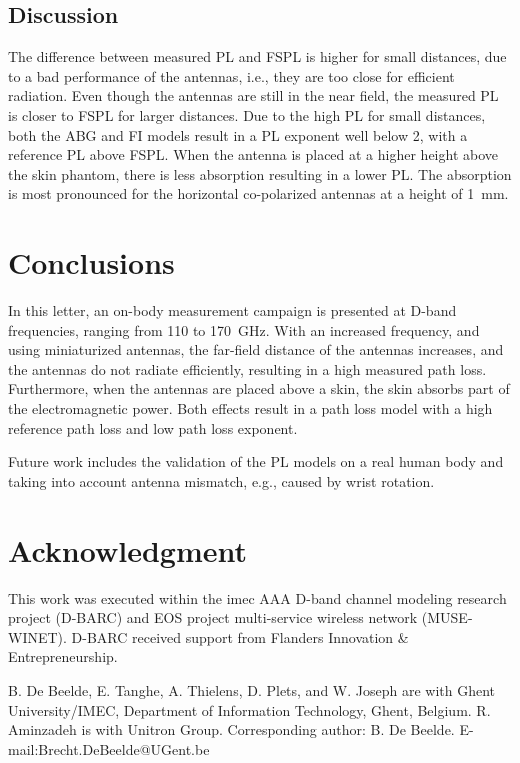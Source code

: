 \documentclass[preprint]{rsl}
\begin{document}
\subsection{Discussion}

The difference between measured PL and FSPL is higher for small distances, due to a bad performance of the antennas, i.e., they are too close for efficient radiation. 
Even though the antennas are still in the near field, the measured PL is closer to FSPL for larger distances. 
Due to the high PL for small distances, both the ABG and FI models result in a PL exponent well below 2, with a reference PL above FSPL. 
When the antenna is placed at a higher height above the skin phantom, there is less absorption resulting in a lower PL. 
The absorption is most pronounced for the horizontal co-polarized antennas at a height of 1~mm.

\section{Conclusions\label{sect:conclusion}}

In this letter, an on-body measurement campaign is presented at D-band frequencies, ranging from 110 to 170~GHz. 
With an increased frequency, and using miniaturized antennas, the far-field distance of the antennas increases, and the antennas do not radiate efficiently, resulting in a high measured path loss. 
Furthermore, when the antennas are placed above a skin, the skin absorbs part of the electromagnetic power.
Both effects result in a path loss model with a high reference path loss and low path loss exponent.

Future work includes the validation of the PL models on a real human body and taking into account antenna mismatch, e.g., caused by wrist rotation.

\section{Acknowledgment}

This work was executed within the imec AAA D-band channel modeling research project (D-BARC) and EOS project multi-service wireless network (MUSE-WINET). 
D-BARC received support from Flanders Innovation \& Entrepreneurship.

\vspace{3pt}

\suppressfloats


\suppressfloats

\vspace{7pt}

%
%
\newpage
\noindent\small
B. De Beelde, E. Tanghe, A. Thielens, D. Plets, and W. Joseph are with Ghent University/IMEC, Department of Information Technology, Ghent, Belgium. 
R. Aminzadeh is with Unitron Group. 
Corresponding author: B. De Beelde. 
E-mail:Brecht.DeBeelde@UGent.be
\end{document}
